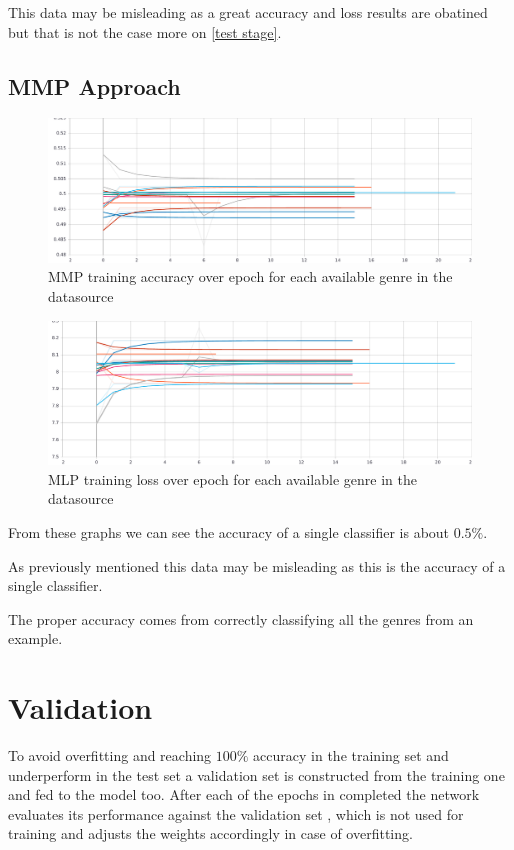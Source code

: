This data may be misleading as a great accuracy and loss results are obatined but that is not the case more on \ref{test stage}.
\FloatBarrier
\subsection{MMP Approach}

\begin{figure}[th]
    \centering
    \includegraphics[width=1.0\textwidth]{Figures/mmp_acc.pdf}
    \decoRule
    \caption[MMP training accuracy]{MMP training accuracy over epoch for each available genre in the datasource}
    \label{fig:MMP training accuracy}
\end{figure}

\begin{figure}[th]
    \centering
    \includegraphics[width=1.0\textwidth]{Figures/mmp_loss.pdf}
    \decoRule
    \caption[MMP training loss]{MLP training loss over epoch for each available genre in the datasource}
    \label{fig:MMP training loss}
\end{figure}

From these graphs we can see the accuracy of a single classifier is about $0.5\%$.

As previously mentioned this data may be misleading as this is the accuracy of a single classifier.

The proper accuracy comes from correctly classifying all the genres from an example.
\newpage

\section{Validation}
To avoid overfitting and reaching $100\%$ accuracy in the training set and underperform in the test set a validation set is constructed from the training one and fed to the model too.
After each of the epochs in completed the network evaluates its performance against the validation set , which is not used for training and adjusts the weights accordingly in case of overfitting.

